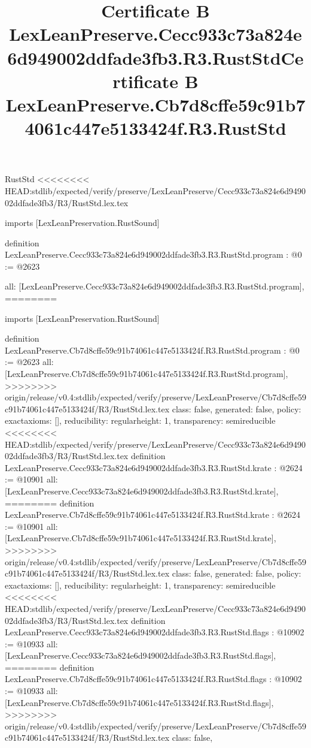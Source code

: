 \begin{lexlean}{RustStd}
<<<<<<<< HEAD:stdlib/expected/verify/preserve/LexLeanPreserve/Cecc933c73a824e6d949002ddfade3fb3/R3/RustStd.lex.tex
\title{Certificate B LexLeanPreserve.Cecc933c73a824e6d949002ddfade3fb3.R3.RustStd}
\begin{coremodule}
imports [LexLeanPreservation.RustSound]

definition LexLeanPreserve.Cecc933c73a824e6d949002ddfade3fb3.R3.RustStd.program : @0 := @2623 {
  all: [LexLeanPreserve.Cecc933c73a824e6d949002ddfade3fb3.R3.RustStd.program],
========
\title{Certificate B LexLeanPreserve.Cb7d8cffe59c91b74061c447e5133424f.R3.RustStd}
\begin{coremodule}
imports [LexLeanPreservation.RustSound]

definition LexLeanPreserve.Cb7d8cffe59c91b74061c447e5133424f.R3.RustStd.program : @0 := @2623 {
  all: [LexLeanPreserve.Cb7d8cffe59c91b74061c447e5133424f.R3.RustStd.program],
>>>>>>>> origin/release/v0.4:stdlib/expected/verify/preserve/LexLeanPreserve/Cb7d8cffe59c91b74061c447e5133424f/R3/RustStd.lex.tex
  class: false,
  generated: false,
  policy: exact{axioms: []},
  reducibility: regular{height: 1},
  transparency: semireducible
}
<<<<<<<< HEAD:stdlib/expected/verify/preserve/LexLeanPreserve/Cecc933c73a824e6d949002ddfade3fb3/R3/RustStd.lex.tex
definition LexLeanPreserve.Cecc933c73a824e6d949002ddfade3fb3.R3.RustStd.krate : @2624 := @10901 {
  all: [LexLeanPreserve.Cecc933c73a824e6d949002ddfade3fb3.R3.RustStd.krate],
========
definition LexLeanPreserve.Cb7d8cffe59c91b74061c447e5133424f.R3.RustStd.krate : @2624 := @10901 {
  all: [LexLeanPreserve.Cb7d8cffe59c91b74061c447e5133424f.R3.RustStd.krate],
>>>>>>>> origin/release/v0.4:stdlib/expected/verify/preserve/LexLeanPreserve/Cb7d8cffe59c91b74061c447e5133424f/R3/RustStd.lex.tex
  class: false,
  generated: false,
  policy: exact{axioms: []},
  reducibility: regular{height: 1},
  transparency: semireducible
}
<<<<<<<< HEAD:stdlib/expected/verify/preserve/LexLeanPreserve/Cecc933c73a824e6d949002ddfade3fb3/R3/RustStd.lex.tex
definition LexLeanPreserve.Cecc933c73a824e6d949002ddfade3fb3.R3.RustStd.flags : @10902 := @10933 {
  all: [LexLeanPreserve.Cecc933c73a824e6d949002ddfade3fb3.R3.RustStd.flags],
========
definition LexLeanPreserve.Cb7d8cffe59c91b74061c447e5133424f.R3.RustStd.flags : @10902 := @10933 {
  all: [LexLeanPreserve.Cb7d8cffe59c91b74061c447e5133424f.R3.RustStd.flags],
>>>>>>>> origin/release/v0.4:stdlib/expected/verify/preserve/LexLeanPreserve/Cb7d8cffe59c91b74061c447e5133424f/R3/RustStd.lex.tex
  class: false,
}}}
\end{coremodule}}
\end{coremodule}
\end{lexlean}
